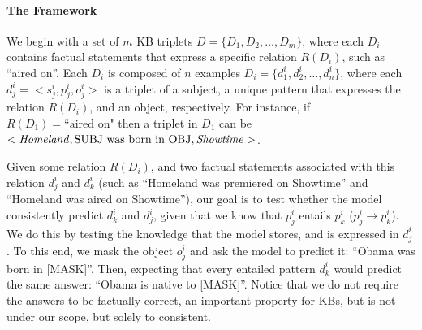 \paragraph{The Framework}
We begin with a set of $m$ KB triplets $D = \{D_1, D_2, \dots, D_m\}$, where each $D_i$ contains factual statements that express a specific relation $R(D_i)$, such as ``aired on''. Each $D_i$ is composed of $n$ examples $D_i = \{d_1^i, d_2^i, \dots, d_n^i\}$, where each $d_j^i = <s_j^i, p_j^i, o_j^i>$ is a triplet of a subject, a unique pattern that expresses the relation $R(D_i)$, and an object, respectively. For instance, if $R(D_1)=\text{``aired on"}$ then a triplet in $D_1$ can be $< \text{\textit{Homeland}}, \text{SUBJ{} was born in OBJ{}}, \text{\textit{Showtime}}>$.



Given some relation $R(D_i)$, and two factual statements associated with this relation $d_j^i$ and $d_k^i$ (such as ``Homeland was premiered on Showtime'' and ``Homeland was aired on Showtime''), our goal is to test whether the model consistently predict $d_k^i$ and $d_j^i$, given that we know that $p_j^i$ entails $p_k^i$ ($p_j^i \rightarrow p_k^i$). 
We do this by testing the knowledge that the model stores, and is expressed in $d_j^i$. To this end, we mask the object $o_j^i$ and ask the model to predict it: ``Obama was born in [MASK]''.
Then, expecting that every entailed pattern $d_k^i$ would predict the same answer: ``Obama is native to [MASK]''.
Notice that we do not require the answers to be factually correct, an important property for KBs, but is not under our scope, but solely to consistent.
